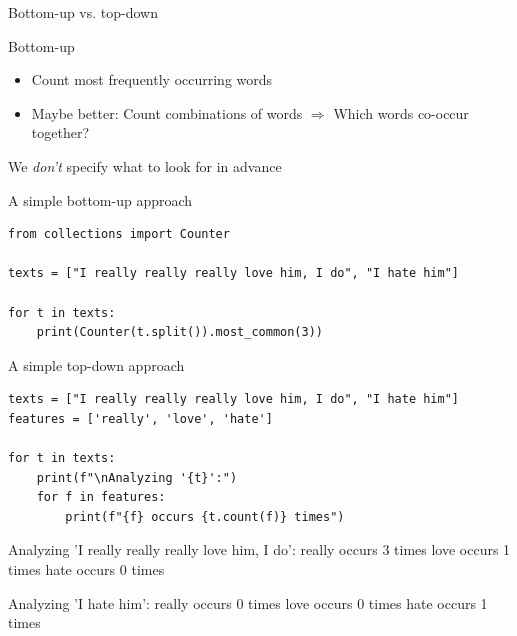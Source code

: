\documentclass[handout]{beamer}
\begin{document}
\begin{frame}{Bottom-up vs. top-down}
	\begin{block}{Bottom-up}
	\begin{itemize}
		\item Count most frequently occurring words 
		\item Maybe better: Count combinations of words $\Rightarrow$ Which words co-occur together?
	\end{itemize}
	We \emph{don't} specify what to look for in advance	
	\end{block}
	
\end{frame}



\begin{frame}[fragile]{A simple bottom-up approach}
\begin{lstlisting}
from collections import Counter

texts = ["I really really really love him, I do", "I hate him"]

for t in texts:
    print(Counter(t.split()).most_common(3))
\end{lstlisting}
\begin{lstlistingoutput}
\end{lstlistingoutput}
\end{frame}




\begin{frame}[fragile]{A simple top-down approach}
\begin{lstlisting}
texts = ["I really really really love him, I do", "I hate him"]
features = ['really', 'love', 'hate']

for t in texts:
    print(f"\nAnalyzing '{t}':")
    for f in features:
        print(f"{f} occurs {t.count(f)} times")
\end{lstlisting}
\begin{lstlistingoutput}
Analyzing 'I really really really love him, I do':
really occurs 3 times
love occurs 1 times
hate occurs 0 times

Analyzing 'I hate him':
really occurs 0 times
love occurs 0 times
hate occurs 1 times

\end{lstlistingoutput}
\end{frame}
\end{document}

